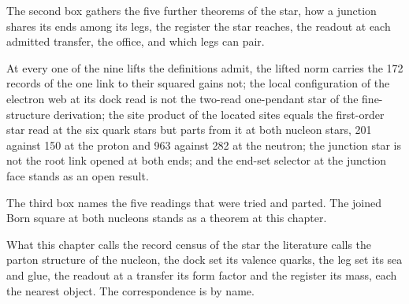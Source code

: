 The second box gathers the five further theorems of the star, how a junction shares its ends among its legs, the register the star reaches, the readout at each admitted transfer, the office, and which legs can pair.
\begin{chwall}\label{box:VII-3-nucleon-structure-and-the-form-factor:3}
At every one of the nine lifts the definitions admit, the lifted norm carries the 172 records of the one link to their squared gains not; the local configuration of the electron web at its dock read is not the two-read one-pendant star of the fine-structure derivation; the site product of the located sites equals the first-order star read at the six quark stars but parts from it at both nucleon stars, 201 against 150 at the proton and 963 against 282 at the neutron; the junction star is not the root link opened at both ends; and the end-set selector at the junction face stands as an open result.
\end{chwall}
The third box names the five readings that were tried and parted. The joined Born square at both nucleons stands as a theorem at this chapter.
\begin{chbridge}
What this chapter calls the record census of the star the literature calls the parton structure of the nucleon, the dock set its valence quarks, the leg set its sea and glue, the readout at a transfer its form factor and the register its mass, each the nearest object. The correspondence is by name.
\end{chbridge}
